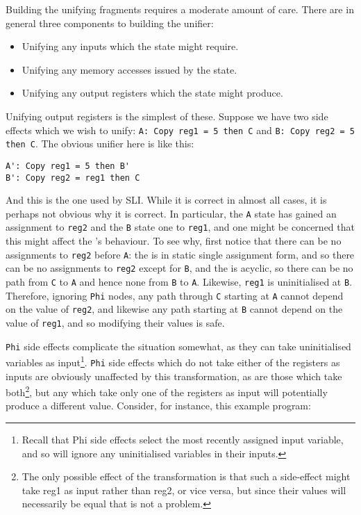 Building the unifying \StateMachine fragments requires a moderate
amount of care.  There are in general three components to building the
unifier:

\begin{itemize}
\item
  Unifying any inputs which the state might require.
\item
  Unifying any memory accesses issued by the state.
\item
  Unifying any output registers which the state might produce.
\end{itemize}

Unifying output registers is the simplest of these.  Suppose we have
two side effects which we wish to unify:
\verb|A: Copy reg1 = 5 then C| and \verb|B: Copy reg2 = 5 then C|.
The obvious unifier here is like this:

\begin{verbatim}
A': Copy reg1 = 5 then B'
B': Copy reg2 = reg1 then C
\end{verbatim}

And this is the one used by SLI.  While it is correct in almost all
cases, it is perhaps not obvious why it is correct.  In particular,
the \verb|A| state has gained an assignment to \verb|reg2| and the
\verb|B| state one to \verb|reg1|, and one might be concerned that
this might affect the \StateMachine's behaviour.  To see why, first
notice that there can be no assignments to \verb|reg2| before
\verb|A|: the \StateMachine is in static single assignment form, and
so there can be no assignments to \verb|reg2| except for \verb|B|, and
the \StateMachine is acyclic, so there can be no path from \verb|C| to
\verb|A| and hence none from \verb|B| to \verb|A|.  Likewise,
\verb|reg1| is uninitialised at \verb|B|.  Therefore, ignoring
\verb|Phi| nodes, any path through \verb|C| starting at \verb|A|
cannot depend on the value of \verb|reg2|, and likewise any path
starting at \verb|B| cannot depend on the value of \verb|reg1|, and so
modifying their values is safe.

\verb|Phi| side effects complicate the situation somewhat, as they can
take uninitialised variables as input\footnote{Recall that Phi side
  effects select the most recently assigned input variable, and so
  will ignore any uninitialised variables in their inputs.}.
\verb|Phi| side effects which do not take either of the registers as
inputs are obviously unaffected by this transformation, as are those
which take both\footnote{The only possible effect of the
  transformation is that such a side-effect might take reg1 as input
  rather than reg2, or vice versa, but since their values will
  necessarily be equal that is not a problem.}, but any which take
only one of the registers as input will potentially produce a
different value.  Consider, for instance, this example program:

